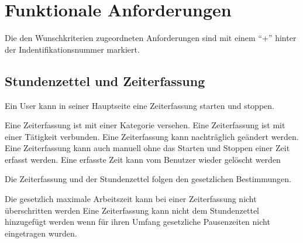 \section{Funktionale Anforderungen}

Die den Wunschkriterien zugeordneten Anforderungen sind mit einem "`+"' hinter der Indentifikationsnummer markiert.

\subsection{Stundenzettel und Zeiterfassung}

\begin{requirements}
    Ein User kann in seiner Hauptseite eine Zeiterfassung starten und stoppen.
    \begin{requirements}
         Eine Zeiterfassung ist mit einer Kategorie versehen.
         Eine Zeiterfassung ist mit einer Tätigkeit verbunden.
         Eine Zeiterfassung kann nachträglich geändert werden.
         Eine Zeiterfassung kann auch manuell ohne das Starten und Stoppen einer Zeit erfasst werden.
         Eine erfasste Zeit kann vom Benutzer wieder gelöscht werden
    \end{requirements}

    Die Zeiterfassung und der Stundenzettel folgen den gesetzlichen Bestimmungen.
    \begin{requirements}
         Die gesetzlich maximale Arbeitszeit kann bei einer Zeiterfassung nicht überschritten werden
         Eine Zeiterfassung kann nicht dem Stundenzettel hinzugefügt werden wenn für ihren Umfang gesetzliche Pausenzeiten nicht eingetragen wurden.
    \end{requirements}


\end{requirements}
